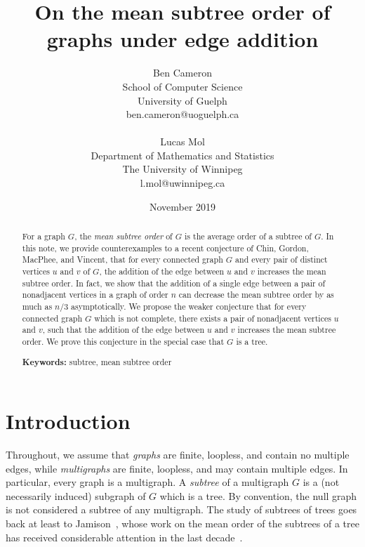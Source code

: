 \documentclass[12pt]{article}
\theoremstyle{definition}
\begin{document}
\title{On the mean subtree order of graphs under edge addition}
\author{Ben Cameron\\
\small School of Computer Science\\
\small University of Guelph\\
\small ben.cameron@uoguelph.ca\\
\\
Lucas Mol\\
\small Department of Mathematics and Statistics\\
\small The University of Winnipeg\\
\small l.mol@uwinnipeg.ca}
\date{November 2019}

\maketitle

\begin{abstract}
\noindent
For a graph $G$, the \textit{mean subtree order} of $G$ is the average order of a subtree of $G$. In this note, we provide counterexamples to a recent conjecture of Chin, Gordon, MacPhee, and Vincent, that for every connected graph $G$ and every pair of distinct vertices $u$ and $v$ of $G$, the addition of the edge between $u$ and $v$ increases the mean subtree order. In fact, we show that the addition of a single edge between a pair of nonadjacent vertices in a graph of order $n$ can decrease the mean subtree order by as much as $n/3$ asymptotically. We propose the weaker conjecture that for every connected graph $G$ which is not complete, there exists a pair of nonadjacent vertices $u$ and $v$, such that the addition of the edge between $u$ and $v$ increases the mean subtree order.  We prove this conjecture in the special case that $G$ is a tree.

\noindent
{\bf Keywords:} subtree, mean subtree order
\end{abstract}

\section{Introduction}

Throughout, we assume that \emph{graphs} are finite, loopless, and contain no multiple edges, while \emph{multigraphs} are finite, loopless, and may contain multiple edges.  In particular, every graph is a multigraph.  A \emph{subtree} of a multigraph $G$ is a (not necessarily induced) subgraph of $G$ which is a tree.  By convention, the null graph is not considered a subtree of any multigraph.  The study of subtrees of trees goes back at least to Jamison~\cite{Jamison1983, Jamison1984}, whose work on the mean order of the subtrees of a tree has received considerable attention in the last decade~\cite{VinceWang2010,WagnerWang2014,WagnerWang2016,Haslegrave2014,MolOellermann2019}. 
\end{document}
